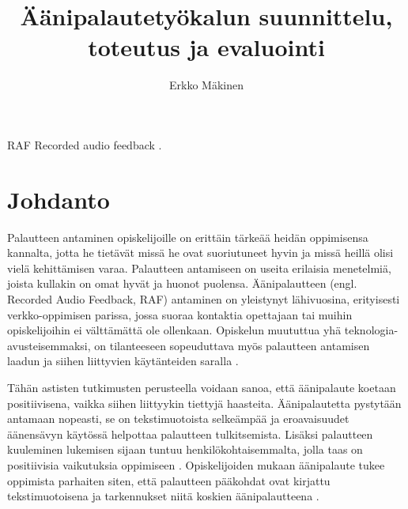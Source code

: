 \documentclass[utf8]{gradu3}
\begin{document}
\title{Äänipalautetyökalun suunnittelu, toteutus ja evaluointi}

\author{Erkko Mäkinen}


\maketitle


\begin{thetermlist}
\item[RAF] Recorded audio feedback \parencite[ks.][]{using}. 
\end{thetermlist}

\mainmatter

\chapter{Johdanto}

Palautteen antaminen opiskelijoille on erittäin tärkeää heidän oppimisensa kannalta, jotta he tietävät missä he ovat suoriutuneet hyvin ja missä heillä olisi vielä kehittämisen varaa. Palautteen antamiseen on useita erilaisia menetelmiä, joista kullakin on omat hyvät ja huonot puolensa. Äänipalautteen (engl. Recorded Audio Feedback, RAF) antaminen on yleistynyt lähivuosina, erityisesti verkko-oppimisen parissa, jossa suoraa kontaktia opettajaan tai muihin opiskelijoihin ei välttämättä ole ollenkaan. Opiskelun muututtua yhä teknologia-avusteisemmaksi, on tilanteeseen sopeuduttava myös palautteen antamisen laadun ja siihen liittyvien käytänteiden saralla \parencite[][]{versus}.

Tähän astisten tutkimusten perusteella voidaan sanoa, että äänipalaute koetaan positiivisena, vaikka siihen liittyykin tiettyjä haasteita. Äänipalautetta pystytään antamaan nopeasti, se on tekstimuotoista selkeämpää ja eroavaisuudet äänensävyn käytössä helpottaa palautteen tulkitsemista. Lisäksi palautteen kuuleminen lukemisen sijaan tuntuu henkilökohtaisemmalta, jolla taas on positiivisia vaikutuksia oppimiseen \parencite[][]{moderating}. Opiskelijoiden mukaan äänipalaute tukee oppimista parhaiten siten, että palautteen pääkohdat ovat kirjattu tekstimuotoisena ja tarkennukset niitä koskien äänipalautteena \parencite[][]{using}.
\end{document}
